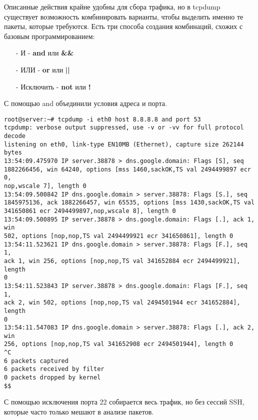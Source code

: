 \documentclass[14pt, a4paper]{article}
\begin{document}
Описанные действия крайне удобны для сбора трафика, но в tcpdump существует возможность
комбинировать варианты, чтобы выделить именно те пакеты, которые требуются. Есть три способа
создания комбинаций, схожих с базовым программированием:
\begin{itemize}
    \item[-] И - \textbf{and} или \textbf{\&\&}
    \item[-] ИЛИ - \textbf{or} или \textbf{||}
    \item[-] Исключить - \textbf{not} или \textbf{!}
\end{itemize}

С помощью \colorbox{backcolour}{and} объединили условия адреса и порта.

\vspace{0.3cm}
\begin{lstlisting}
root@server:~# tcpdump -i eth0 host 8.8.8.8 and port 53
tcpdump: verbose output suppressed, use -v or -vv for full protocol decode
listening on eth0, link-type EN10MB (Ethernet), capture size 262144 bytes
13:54:09.475970 IP server.38878 > dns.google.domain: Flags [S], seq 
1882266456, win 64240, options [mss 1460,sackOK,TS val 2494499897 ecr 0,
nop,wscale 7], length 0
13:54:09.500842 IP dns.google.domain > server.38878: Flags [S.], seq 
1845975136, ack 1882266457, win 65535, options [mss 1430,sackOK,TS val 
341650861 ecr 2494499897,nop,wscale 8], length 0
13:54:09.500895 IP server.38878 > dns.google.domain: Flags [.], ack 1, win 
502, options [nop,nop,TS val 2494499921 ecr 341650861], length 0
13:54:11.523621 IP dns.google.domain > server.38878: Flags [F.], seq 1, 
ack 1, win 256, options [nop,nop,TS val 341652884 ecr 2494499921], length 
0
13:54:11.523843 IP server.38878 > dns.google.domain: Flags [F.], seq 1, 
ack 2, win 502, options [nop,nop,TS val 2494501944 ecr 341652884], length 
0
13:54:11.547083 IP dns.google.domain > server.38878: Flags [.], ack 2, win 
256, options [nop,nop,TS val 341652908 ecr 2494501944], length 0
^C
6 packets captured
6 packets received by filter
0 packets dropped by kernel
$$
\end{lstlisting}
\vspace{0.2cm}

С помощью исключения порта 22 собирается весь трафик, но без сессий SSH, которые часто только
мешают в анализе пакетов.
\end{document}
